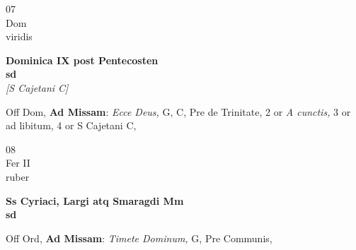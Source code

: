 \documentclass[10pt, openany]{book}
\begin{document}
        \begin{center}
            \begin{minipage}{3.5in}
                \vspace{2em}
                \begin{minipage}{0.5in}
                    {\Huge 07} \\
                    {\normalsize Dom} \\
                    {\normalsize viridis}
                \end{minipage}
                \begin{minipage}{3.0in}
                    \textbf{ \large Dominica IX post Pentecosten \\
                    \textnormal{\normalsize sd}} \\ \textit{[S Cajetani C]} \\ 
                \end{minipage}
                \begin{justify}Off Dom, \textbf{Ad Missam}: \textit{Ecce Deus,} G, C, Pre de Trinitate, 2 or \textit{A cunctis,} 3 or ad libitum, 4 or S Cajetani C,  
                \end{justify}
            \end{minipage}
        \end{center}
    
        \begin{center}
            \begin{minipage}{3.5in}
                \vspace{2em}
                \begin{minipage}{0.5in}
                    {\Huge 08} \\
                    {\normalsize Fer II} \\
                    {\normalsize ruber}
                \end{minipage}
                \begin{minipage}{3.0in}
                    \textbf{ \large Ss Cyriaci, Largi atq Smaragdi Mm \\
                    \textnormal{\normalsize sd}} \\ 
                \end{minipage}
                \begin{justify}Off Ord, \textbf{Ad Missam}: \textit{Timete Dominum,} G, Pre Communis,  
                \end{justify}
            \end{minipage}
        \end{center}
    
\end{document}
